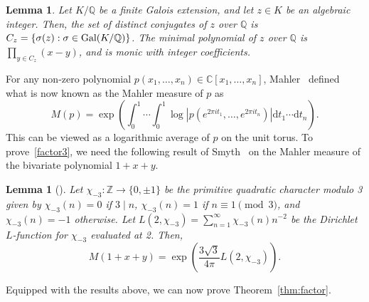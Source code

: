 \documentclass{article}
\newtheorem{lemma}[theorem]{Lemma}
\begin{document}
\begin{lemma}\label{lemma:minpoly}
Let $K/\mathbb{Q}$ be a finite Galois extension, and let $z\in K$ be an algebraic integer. Then, the set of distinct conjugates of $z$ over $\mathbb{Q}$ is $C_z=\{\sigma(z):\sigma\in\textup{Gal}(K/\mathbb{Q})\}$. The minimal polynomial of $z$ over $\mathbb{Q}$ is $\prod_{y\in C_z}(x-y)$, and is monic with integer coefficients.
\end{lemma}

For any non-zero polynomial $p(x_1,\ldots,x_n)\in\mathbb{C}[x_1,\ldots,x_n]$, Mahler~\cite{Mah} defined what is now known as the Mahler measure of $p$ as
\[M(p)=\exp\left(\int_0^1\cdots\int_0^1\log|p(e^{2\pi i t_1},\ldots,e^{2\pi i t_n})|\text{d}t_1\cdots\text{d}t_n\right).\]
This can be viewed as a logarithmic average of $p$ on the unit torus. To prove~\ref{factor3}, we need the following result of Smyth~{\cite{S}} on the Mahler measure of the bivariate polynomial $1+x+y$.
\begin{lemma}[{\cite[Example 5]{S}}]\label{lemma:smyth}
Let $\chi_{-3}:\mathbb{Z}\to\{0,\pm1\}$ be the primitive quadratic character modulo 3 given by $\chi_{-3}(n)=0$ if $3\mid n$, $\chi_{-3}(n)=1$ if $n\equiv 1\pmod 3$, and $\chi_{-3}(n)=-1$ otherwise. Let $L(2,\chi_{-3})=\sum_{n=1}^\infty\chi_{-3}(n)n^{-2}$ be the Dirichlet $L$-function for $\chi_{-3}$ evaluated at 2.
Then, 
\[M(1+x+y)=\exp\left(\frac{3\sqrt3}{4\pi}L(2,\chi_{-3})\right).\]
\end{lemma}

Equipped with the results above, we can now prove Theorem~\ref{thm:factor}.
\end{document}
